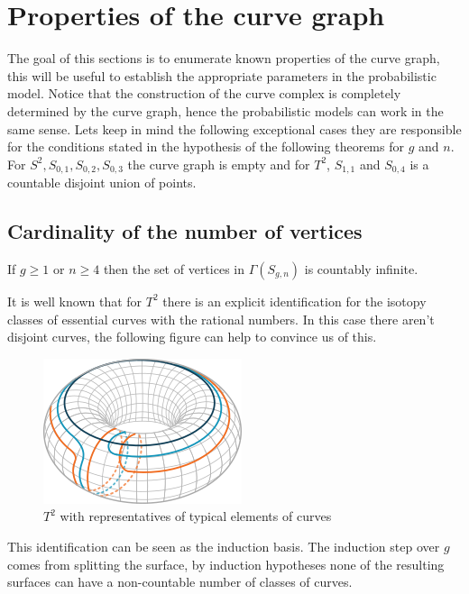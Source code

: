 \section{Properties of the curve graph}
The goal of this sections is to enumerate known properties of the curve graph, this will be useful to establish the appropriate parameters in the probabilistic model. Notice that the construction of the curve complex is completely determined by the curve graph, hence the probabilistic models can work in the same sense. Lets keep in mind the following exceptional cases they are responsible for the conditions stated in the hypothesis of the following theorems for $g$ and $n$. For $ S^2, S_{0,1}, S _{0,2}, S_{0,3} $ the curve graph is empty and for  $ T^{2} $, $ S_{1,1}$ and $ S_{0,4}$ is a countable disjoint union of points.

\subsection{Cardinality of the number of vertices}
\begin{theorem}
If $g\geq 1$ or $n\geq 4$ then the set of vertices in $\Gamma(S_{g,n})$ is countably infinite.
\end{theorem}

It is well known that for $T^{2}$ there is an explicit identification for the isotopy classes of essential curves with the rational numbers. In this case there aren't disjoint curves, the following figure can help to convince us of this.
\vspace{1cm}
\begin{figure}[h!]
	\centering
	\includegraphics[scale=0.7]{Figures/Torus.png}
	\caption{$T^{2}$ with representatives of typical elements of curves}
\end{figure}

This identification can be seen as the induction basis. The induction step over $g$ comes from splitting the surface, by induction hypotheses none of the resulting surfaces can have a non-countable number of classes of curves.

